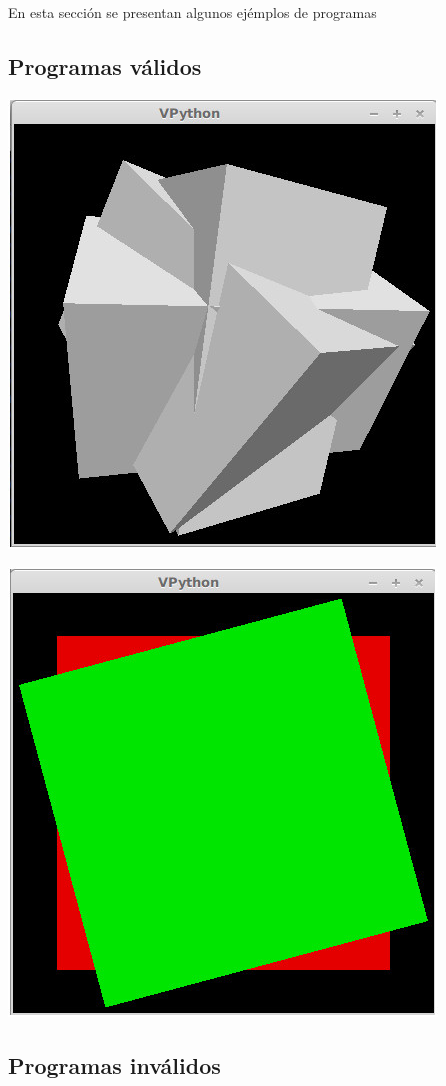 En esta secci\'on se presentan algunos ej\'emplos de programas

\subsection{Programas v\'alidos}



\centerline{\includegraphics[scale=0.40]{../imagenes/eg04.jpg}}





\centerline{\includegraphics[scale=0.40]{../imagenes/eg11.jpg}}

\subsection{Programas inv\'alidos}
